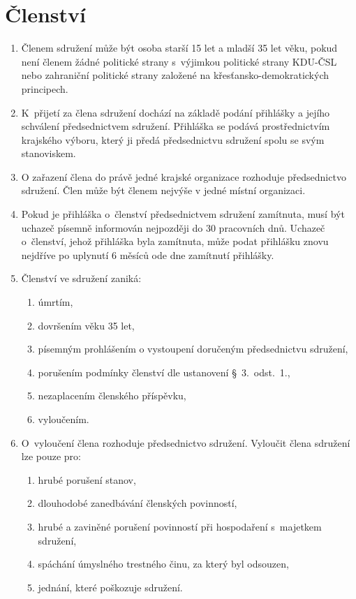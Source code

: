 \documentclass[a4paper]{article}
\begin{document}
\section{Členství}
    \begin{enumerate}
    \item Členem sdružení může být osoba starší 15 let a mladší 35 let věku,
        pokud není členem žádné politické strany s~výjimkou politické strany
        KDU-ČSL nebo zahraniční politické strany založené na
        křesťansko-demokratických principech.

    \item K~přijetí za člena sdružení dochází na základě podání přihlášky a
        jejího schválení předsednictvem sdružení. Přihláška se podává
        prostřednictvím krajského výboru, který ji předá předsednictvu
        sdružení spolu se svým stanoviskem.

    \item O zařazení člena do právě jedné krajské organizace rozhoduje předsednictvo
        sdružení. Člen může být členem nejvýše v jedné místní organizaci.

    \item Pokud je přihláška o~členství předsednictvem sdružení zamítnuta,
        musí být uchazeč písemně informován nejpozději do 30 pracovních dnů.
        Uchazeč o~členství, jehož přihláška byla zamítnuta, může podat
        přihlášku znovu nejdříve po uplynutí 6 měsíců ode dne zamítnutí
        přihlášky.

    \item Členství ve sdružení zaniká:
        \begin{enumerate}
        \item úmrtím,
        \item dovršením věku 35 let,
        \item písemným prohlášením o vystoupení doručeným předsednictvu
            sdružení,
        \item porušením podmínky členství dle ustanovení \S~3.~odst.~1.,
        \item nezaplacením členského příspěvku,
        \item vyloučením.
        \end{enumerate}

    \item O~vyloučení člena rozhoduje předsednictvo sdružení. Vyloučit člena
        sdružení lze pouze pro:
        \begin{enumerate}
        \item hrubé porušení stanov,
        \item dlouhodobé zanedbávání členských povinností,
        \item hrubé a zaviněné porušení povinností při hospodaření s~majetkem
            sdružení,
        \item spáchání úmyslného trestného činu, za který byl odsouzen,
        \item jednání, které poškozuje sdružení.
        \end{enumerate}


\end{enumerate}
\end{document}
